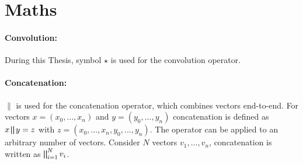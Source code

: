 \section{Maths}
\paragraph{Convolution:}
During this Thesis, symbol $\star$ is used for the convolution operator.

\paragraph{Concatenation:}
$\parallel$ is used for the concatenation operator, which combines vectors end-to-end. 
For vectors $x=(x_0, \dots, x_n)$ and $y=(y_0, \dots, y_n)$ concatenation is defined as 
$ x \bigparallel y = z$ with $z=(x_0, \dots, x_n, y_0, \dots, y_n) $. 
The operator can be applied to an arbitrary number of vectors.
Consider $N$ vectors $v_1, \dots, v_n$, concatenation is written as  $\bigparallel^N_{i=1} v_i$.
